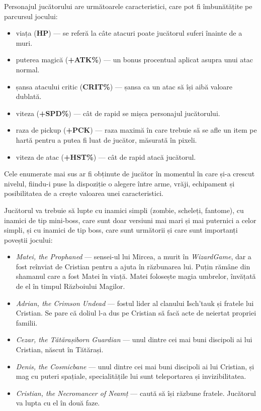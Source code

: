 \documentclass{article}
\begin{document}
    Personajul jucătorului are următoarele caracteristici, care pot fi îmbunătățite pe parcursul
    jocului:
    \begin{itemize} \label{sec:stats}
        \item viața (\textbf{HP}) --- se referă la câte atacuri poate jucătorul suferi înainte de a muri.
        \item puterea magică (\textbf{+ATK\%}) --- un bonus procentual aplicat asupra unui atac normal.
        \item șansa atacului critic (\textbf{CRIT\%}) --- șansa ca un atac să își aibă valoare dublată.
        \item viteza (\textbf{+SPD\%}) --- cât de rapid se mișca personajul jucătorului.
        \item raza de pickup (\textbf{+PCK}) --- raza maximă în care trebuie să se afle un item
        pe hartă pentru a putea fi luat de jucător, măsurată în pixeli.
        \item viteza de atac (\textbf{+HST\%}) --- cât de rapid atacă jucătorul.
    \end{itemize}
    \label{sec:pcs}

    Cele enumerate mai sus ar fi obținute de jucător în momentul în care și-a crescut nivelul,
    fiindu-i puse la dispoziție o alegere între arme, vrăji, echipament și posibilitatea de a
    crește valoarea unei caracteristici.

    \label{sec:exts}
    Jucătorul va trebuie să lupte cu inamici simpli (zombie, scheleți, fantome), cu inamici de tip
    mini-boss, care sunt doar versiuni mai mari și mai puternici a celor simpli, și cu inamici de
    tip boss, care sunt următorii și care sunt importanți poveștii jocului:
    \begin{itemize}
        \item \emph{Matei, the Prophaned} --- sensei-ul lui Mircea, a murit în \emph{WizardGame}, dar a
        fost reînviat de Cristian pentru a ajuta în răzbunarea lui. Puțin rămâne din shamanul care
        a fost Matei în viață. Matei folosește magia umbrelor, învățată de el în timpul Războiului Magilor.
        \item \emph{Adrian, the Crimson Undead} --- fostul lider al clanului Isch'tauk și fratele
        lui Cristian. Se pare că doliul l-a dus pe Cristian să facă acte de neiertat propriei familii.
        \item \emph{Cezar, the Tătărașiborn Guardian} --- unul dintre cei mai buni discipoli ai lui
        Cristian, născut în Tătărași.
        \item \emph{Denis, the Cosmicbane} --- unul dintre cei mai buni discipoli ai lui Cristian, și
        mag cu puteri spațiale, specialitățile lui sunt teleportarea și invizibilitatea.
        \item \emph{Cristian, the Necromancer of Neamț} --- caută să își răzbune fratele. Jucătorul va
        lupta cu el în două faze.
    \end{itemize}
\end{document}
